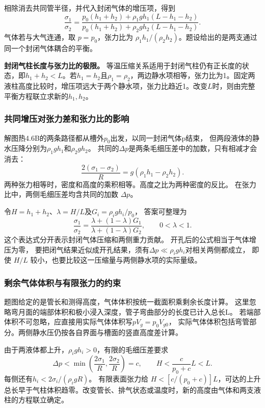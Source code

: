 \documentclass[UTF8,fontset=fandol,a4paper,11pt]{ctexart}
\newcommand{\result}[1]{\boxed{#1}}
\begin{document}
相除消去共同管半径，并代入封闭气体的增压项，得到
\[
\result{\frac{\sigma_1}{\sigma_2}
=\frac{p_0(h_1+h_2)+\rho_1gh_1(L-h_1-h_2)}
{p_0(h_1+h_2)+\rho_2gh_2(L-h_1-h_2)}}.
\]
气体若与大气连通，取 $p=p_0$，张力比为 $\rho_1h_1/(\rho_2h_2)$。题设给出的是两支通过同一个封闭气体耦合的平衡。

\textbf{封闭气柱长度与张力比的极限。} 等温压缩关系适用于封闭气柱仍有正长度的状态，即$h_1+h_2<L$。若$h_1=h_2$且$\rho_1=\rho_2$，两边静水项相等，张力比为1。固定两液柱高度比较时，增压项远大于两个静水项，张力比趋近1。改变$L$时，则由完整平衡方程联立求新的$h_1,h_2$。
\subsubsection*{共同增压对张力差和张力比的影响}
解图热4.6B的两条路径都从槽外$p_0$出发，以同一封闭气体p结束，
但两段液体的静水压降分别为$\rho_1gh_1$和$\rho_2gh_2$。
共同的$\Delta p$是两条毛细压差中的加数，只有相减才会消去：
\[
\frac{2(\sigma_1-\sigma_2)}R
=g(\rho_1h_1-\rho_2h_2).
\]
两种张力相等时，密度和高度的乘积相等。高度之比为两种密度的反比。
在张力比中，两侧毛细压差均含共同的加数 $\Delta p$。

令$H=h_1+h_2$、$\lambda=H/L$及$G_i=\rho_igh_i/p_0$，
答案可整理为
\[
\frac{\sigma_1}{\sigma_2}
=\frac{\lambda+(1-\lambda)G_1}
{\lambda+(1-\lambda)G_2},\qquad0<\lambda<1.
\]
这个表达式分开表示封闭气体压缩和两侧重力贡献。
开孔后的公式相当于气体增压为零，
要把闭气结果近似成开孔结果，须有$\Delta p\ll\rho_igh_i$对相关两侧都成立，
即使 $H/L$ 较小，也要比较这一压缩量与两侧静水项的实际量级。

\subsubsection*{剩余气体体积与有限张力的约束}
题图给定的是管长和测得高度，气体体积按统一截面积乘剩余长度计算。
这里忽略弯月面的端部体积和极小浸入深度，管子弯曲部分的长度已计入总长L。
若端部体积不可忽略，应直接用实际气体体积写$pV_g=p_0V_{g0}$，
实际气体体积包括弯管部分。两侧静水压仍按各自界面与槽面的竖直高度差计算。

由于两液体都上升，$\rho_igh_i>0$，有限的毛细压差要求
\[
\Delta p<\min\left(\frac{2\sigma_1}R,\frac{2\sigma_2}R\right)=c,
\qquad H<\frac{c}{p_0+c}L<L.
\]
每侧还有$h_i<2\sigma_i/(\rho_i gR)$。
有限表面张力给 $H<[c/(p_0+c)]L$，可达的上升总长早于气柱体积趋零。改变管长、排气状态或温度时，新的高度由气体和两支液柱的方程联立确定。



\end{document}
